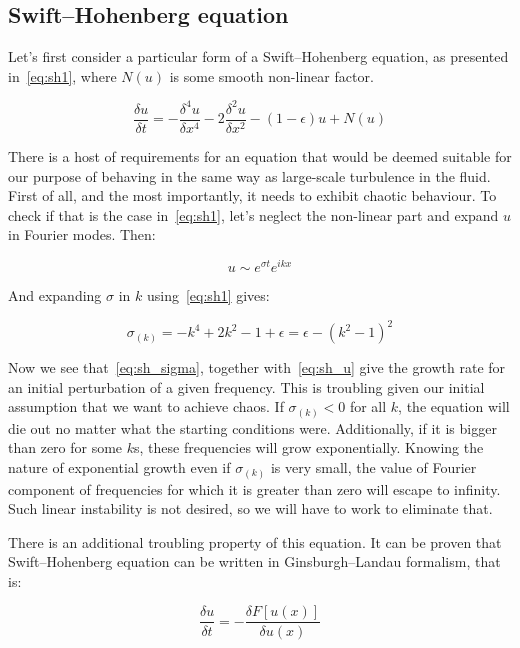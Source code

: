 \documentclass[11pt,a4paper]{article}
\begin{document}
\subsection{Swift--Hohenberg equation}
Let's first consider a particular form of a Swift--Hohenberg\cite{Hohenberg74} equation, as presented in~\eqref{eq:sh1}, where $N(u)$ is some smooth non-linear factor.

\begin{equation}\label{eq:sh1}
\frac{\delta u}{\delta t} = -\frac{\delta^4u}{\delta x^4} - 2\frac{\delta^2u}{\delta x^2} - (1 - \epsilon )u + N(u)
\end{equation}

There is a host of requirements for an equation that would be deemed suitable for our purpose of behaving in the same way as large-scale turbulence in the fluid.
First of all, and the most importantly, it needs to exhibit chaotic behaviour.
To check if that is the case in~\eqref{eq:sh1}, let's neglect the non-linear part and expand $u$ in Fourier modes. Then:

\begin{equation}\label{eq:sh_u}
    u \sim e^{\sigma t}e^{ikx}
\end{equation}

And expanding $\sigma$ in $k$ using~\eqref{eq:sh1} gives:

\begin{equation}\label{eq:sh_sigma}
    \sigma_{(k)} = -k^4 + 2k^2 - 1 + \epsilon = \epsilon - (k^2 - 1)^2
\end{equation}

Now we see that~\eqref{eq:sh_sigma}, together with~\eqref{eq:sh_u} give the growth rate for an initial perturbation of a given frequency.
This is troubling given our initial assumption that we want to achieve chaos.
If $\sigma_{(k)} < 0$ for all $k$, the equation will die out no matter what the starting conditions were.
Additionally, if it is bigger than zero for some $k$s, these frequencies will grow exponentially.
Knowing the nature of exponential growth even if $\sigma_{(k)}$ is very small, the value of Fourier component of frequencies for which it is greater than zero will escape to infinity.
Such linear instability is not desired, so we will have to work to eliminate that.

There is an additional troubling property of this equation.
It can be proven\cite{Schneider96} that Swift--Hohenberg equation can be written in Ginsburgh--Landau formalism, that is:

\begin{equation}\label{eq:sh_landau}
    \frac{\delta u}{\delta t} = - \frac{\delta F[u(x)]}{\delta u(x)}
\end{equation}
\end{document}

